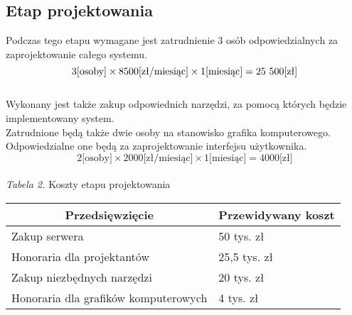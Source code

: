 \documentclass 	[11pt, a4paper, leqno]	{article}					%
\begin{document}
\subsection{Etap projektowania}
\noindent
Podczas tego etapu wymagane jest zatrudnienie 3 osób odpowiedzialnych za zaprojektowanie całego systemu. \\
\begin{equation}3 \text{[osoby]} \times  8500 \text{[zł/miesiąc]} \times 1 \text{[miesiąc]} = 25\\\ 500 \text{[zł]} \end{equation} \\
Wykonany jest także zakup odpowiednich narzędzi, za pomocą których będzie implementowany system.  \\
Zatrudnione będą także dwie osoby na stanowisko grafika komputerowego. Odpowiedzialne one będą za zaprojektowanie interfejsu użytkownika. \\
\begin{equation}2 \text{[osoby]} \times 2000 \text{[zł/miesiąc]} \times 1 \text{[miesiąc]} = 4000 \text{[zł]} \end{equation} \\
\textit{Tabela 2.} Koszty etapu projektowania

\begin{center}
	\begin{tabular}{| l | l |}
		\hline
		\multicolumn{1}{|c|}{Przedsięwzięcie} & 
		\multicolumn{1}{|c|}{Przewidywany koszt} \\ \hline \hline
		Zakup serwera & 50 tys. zł \\ \hline
		Honoraria dla projektantów & 25,5 tys. zł \\ \hline
		Zakup niezbędnych narzędzi & 20 tys. zł \\ \hline
		Honoraria dla grafików komputerowych & 4 tys. zł \\ \hline
	\end{tabular}
\end{center}
\end{document}
